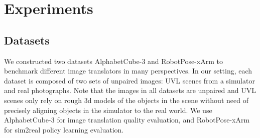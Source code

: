 \documentclass{article}
\begin{document}


\vspace{-8pt}
\section{Experiments}\label{sec:results}
\vspace{-3pt}
\subsection{Datasets}
\vspace{-2pt}
We constructed two datasets AlphabetCube-3 and RobotPose-xArm to benchmark different image translators in many perspectives.
In our setting, each dataset is composed of two sets of unpaired images: UVL scenes from a simulator and real photographs.
Note that the images in all datasets are unpaired and UVL scenes only rely on rough 3d models of the objects in the scene without need of precisely aligning objects in the simulator to the real world.
We use AlphabetCube-3 for image translation quality evaluation, and RobotPose-xArm for sim2real policy learning evaluation.



\end{document}
